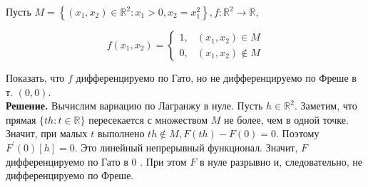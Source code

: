 \begin{task}

Пусть $M=\left\{\left(x_{1}, x_{2}\right) \in \mathbb{R}^{2}: x_{1}>0, x_{2}=x_{1}^{2}\right\}, f: \mathbb{R}^{2} \rightarrow \mathbb{R}$,

$$
f\left(x_{1}, x_{2}\right)= \begin{cases}1, & \left(x_{1}, x_{2}\right) \in M \\ 0, & \left(x_{1}, x_{2}\right) \notin M\end{cases}
$$

Показать, что $f$ дифференцируемо по Гато, но не дифференцируемо по Фреше в т. $(0,0)$.\\

\textbf{Решение.} Вычислим вариацию по Лагранжу в нуле. Пусть $h \in \mathbb{R}^{2}$. Заметим, что прямая $\{t h: t \in \mathbb{R}\}$ пересекается с множеством $M$ не более, чем в одной точке. Значит, при малых $t$ выполнено $t h \notin M, F(t h)-F(0)=0$. Поэтому $F^{\prime}(0)[h]=0$. Это линейный непрерывный функционал. Значит, $F$ дифференцируемо по Гато в 0 . При этом $F$ в нуле разрывно и, следовательно, не дифференцируемо по Фреше.

\end{task}
